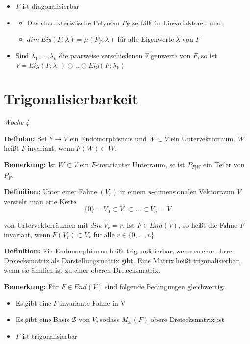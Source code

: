 \documentclass{article}
\begin{document}
\begin{itemize}
\item[i)] $F$ ist diagonalisierbar
\item[ii)]
	\begin{itemize}
	\item[a)] Das charakteristische Polynom $P_F$ zerfällt in
		Linearfaktoren und
	\item[b)] $dim\ Eig(F;\lambda)=\mu(P_F;\lambda)$ für alle Eigenwerte
		$\lambda$ von $F$
	\end{itemize}
\item[iii)] Sind $\lambda_1,\dots, \lambda_k$ die paarweise verschiedenen
	Eigenwerte von $F$, so ist $V=Eig(F;\lambda_1)\oplus\dots\oplus
	Eig(F;\lambda_k)$
\end{itemize}


\section{Trigonalisierbarkeit}

\textit{\small \hspace{-1.5cm}Woche 4}

\textbf{Definion:} Sei $F\to V$ ein Endomorphismus und $W\subset V$ ein
Untervektorraum. $W$ heißt $F$-invariant, wenn $F(W)\subset W$.

\textbf{Bemerkung:} Ist $W\subset V$ ein $F$-invarianter Unterraum, so ist
$P_{F|W}$ ein Teiler von $P_F$.

\textbf{Definition:} Unter einer Fahne $(V_r)$ in einem $n$-dimensionalen
Vektorraum $V$ versteht man eine Kette 
\begin{equation*}
\{0\} =V_0\subset
V_1\subset\dots\subset V_n=V
\end{equation*}

von Untervektorräumen mit $dim\ V_r=r$. Ist $F\in End(V)$, so heißt die Fahne
$F$-invariant, wenn $F(V_r)\subset V_r$ für alle $r\in\{0,\dots,n\}$

\textbf{Definition:} Ein Endomorphismus heißt trigonalisierbar, wenn es eine
obere Dreiecksmatrix als Darstellungsmatrix gibt. Eine Matrix heißt
trigonalisierbar, wenn sie ähnlich ist zu einer oberen Dreiecksmatrix.

\textbf{Bemerkung:} Für $F\in End(V)$ sind folgende Bedingungen gleichwertig:
\begin{itemize}
\item[i)] Es gibt eine $F$-invariante Fahne in V
\item[ii)] Es gibt eine Basis $\mathcal{B}$ von $V$, sodass $M_\mathcal{B}(F)$
	obere Dreiecksmatrix ist
\item[iii)] $F$ ist trigonalisierbar
\end{itemize}
\end{document}
